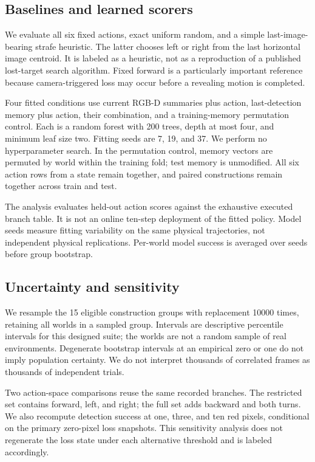 \documentclass[10pt,twocolumn,a4paper]{article}
\begin{document}
\subsection{Baselines and learned scorers}
We evaluate all six fixed actions, exact uniform random, and a simple last-image-bearing strafe heuristic. The latter chooses left or right from the last horizontal image centroid. It is labeled as a heuristic, not as a reproduction of a published lost-target search algorithm. Fixed forward is a particularly important reference because camera-triggered loss may occur before a revealing motion is completed.

Four fitted conditions use current RGB-D summaries plus action, last-detection memory plus action, their combination, and a training-memory permutation control. Each is a random forest with 200 trees, depth at most four, and minimum leaf size two. Fitting seeds are 7, 19, and 37. We perform no hyperparameter search. In the permutation control, memory vectors are permuted by world within the training fold; test memory is unmodified. All six action rows from a state remain together, and paired constructions remain together across train and test.

The analysis evaluates held-out action scores against the exhaustive executed branch table. It is not an online ten-step deployment of the fitted policy. Model seeds measure fitting variability on the same physical trajectories, not independent physical replications. Per-world model success is averaged over seeds before group bootstrap.

\subsection{Uncertainty and sensitivity}
We resample the 15 eligible construction groups with replacement 10000 times, retaining all worlds in a sampled group. Intervals are descriptive percentile intervals for this designed suite; the worlds are not a random sample of real environments. Degenerate bootstrap intervals at an empirical zero or one do not imply population certainty. We do not interpret thousands of correlated frames as thousands of independent trials.

Two action-space comparisons reuse the same recorded branches. The restricted set contains forward, left, and right; the full set adds backward and both turns. We also recompute detection success at one, three, and ten red pixels, conditional on the primary zero-pixel loss snapshots. This sensitivity analysis does not regenerate the loss state under each alternative threshold and is labeled accordingly.
\end{document}
